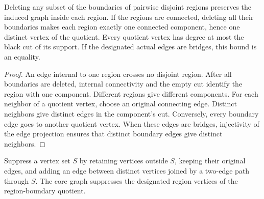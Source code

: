 \begin{theorem}
  \label{thm:lowerbounds-algebraic-quotient-region-vertices}
  \leanok
  Deleting any subset of the boundaries of pairwise disjoint regions
  preserves the induced graph inside each region. If the regions are
  connected, deleting all their boundaries makes each region exactly
  one connected component, hence one distinct vertex of the quotient.
  Every quotient vertex has degree at most the black cut of its support.
  If the designated actual edges are bridges, this bound is an equality.
\end{theorem}
\begin{proof}
  \leanok
  An edge internal to one region crosses no disjoint region. After all
  boundaries are deleted, internal connectivity and the empty cut identify
  the region with one component. Different regions give different components.
  For each neighbor of a quotient vertex, choose an original connecting
  edge. Distinct neighbors give distinct edges in the component's cut.
  Conversely, every boundary edge goes to another quotient vertex. When
  these edges are bridges, injectivity of the edge projection ensures
  that distinct boundary edges give distinct neighbors.
\end{proof}

\begin{definition}
  \label{def:lowerbounds-algebraic-path-suppression}
  \leanok
  Suppress a vertex set $S$ by retaining vertices outside $S$, keeping
  their original edges, and adding an edge between distinct vertices
  joined by a two-edge path through $S$. The core graph suppresses the
  designated region vertices of the region-boundary quotient.
\end{definition}

